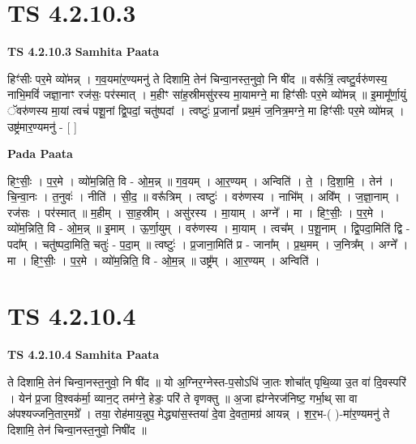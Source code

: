 \documentclass[17pt]{extarticle}
\begin{document}

\section{ TS 4.2.10.3 }

\textbf{TS 4.2.10.3 } \newline
\textbf{Samhita Paata} \newline

हिꣳ॑सीः पर॒मे व्यो॑मन्न् । ग॒व॒यमा॑र॒ण्यमनु॑ ते दिशामि॒ तेन॑ चिन्वा॒नस्त॒नुवो॒ नि षी॑द ॥ वरू᳚त्रिं॒ त्वष्टु॒र्वरु॑णस्य॒ नाभि॒मविं॑ जज्ञा॒नाꣳ रज॑सः॒ पर॑स्मात् । म॒हीꣳ सा॑ह॒स्रीमसु॑रस्य मा॒यामग्ने॒ मा हिꣳ॑सीः पर॒मे व्यो॑मन्न् ॥ इ॒मामू᳚र्णा॒युं ॅवरु॑णस्य मा॒यां त्वचं॑ पशू॒नां द्वि॒पदां॒ चतु॑ष्पदां । त्वष्टुः॑ प्र॒जानां᳚ प्रथ॒मं ज॒नित्र॒मग्ने॒ मा हिꣳ॑सीः पर॒मे व्यो॑मन्न् । उष्ट्र॑मार॒ण्यमनु॑ - [  ] \newline

\textbf{Pada Paata} \newline

हिꣳ॒॒सीः॒ । प॒र॒मे । व्यो॑म॒न्निति॒ वि - ओ॒म॒न्न् ॥ ग॒व॒यम् । आ॒र॒ण्यम् । अन्विति॑ । ते॒ । दि॒शा॒मि॒ । तेन॑ । चि॒न्वा॒नः । त॒नुवः॑ । नीति॑ । सी॒द॒ ॥ वरू᳚त्रिम् । त्वष्टुः॑ । वरु॑णस्य । नाभि᳚म् । अवि᳚म् । ज॒ज्ञा॒नाम् । रज॑सः । पर॑स्मात् ॥ म॒हीम् । सा॒ह॒स्रीम् । असु॑रस्य । मा॒याम् । अग्ने᳚ । मा । हिꣳ॒॒सीः॒ । प॒र॒मे । व्यो॑म॒न्निति॒ वि - ओ॒म॒न्न् ॥ इ॒माम् । ऊ॒र्णा॒युम् । वरु॑णस्य । मा॒याम् । त्वच᳚म् । प॒शू॒नाम् । द्वि॒पदा॒मिति॑ द्वि - पदा᳚म् । चतु॑ष्पदा॒मिति॒ चतुः॑ - प॒दा॒म् ॥ त्वष्टुः॑ । प्र॒जाना॒मिति॑ प्र - जाना᳚म् । प्र॒थ॒मम् । ज॒नित्र᳚म् । अग्ने᳚ । मा । हिꣳ॒॒सीः॒ । प॒र॒मे । व्यो॑म॒न्निति॒ वि - ओ॒म॒न्न् ॥ उष्ट्र᳚म् । आ॒र॒ण्यम् । अन्विति॑ ।  \newline





\section{ TS 4.2.10.4 }

\textbf{TS 4.2.10.4 } \newline
\textbf{Samhita Paata} \newline

ते दिशामि॒ तेन॑ चिन्वा॒नस्त॒नुवो॒ नि षी॑द ॥ यो अ॒ग्निर॒ग्नेस्त-प॒सोऽधि॑ जा॒तः शोचा᳚त् पृथि॒व्या उ॒त वा॑ दि॒वस्परि॑ । येन॑ प्र॒जा वि॒श्वक॑र्मा॒ व्यान॒ट् तम॑ग्ने॒ हेडः॒ परि॑ ते वृणक्तु ॥ अ॒जा ह्य॑ग्नेरज॑निष्ट॒ गर्भा॒थ् सा वा अ॑पश्यज्जनि॒तार॒मग्रे᳚ । तया॒ रोह॑माय॒न्नुप॒ मेद्ध्या॑स॒स्तया॑ दे॒वा दे॒वता॒मग्र॑ आयन्न् । श॒र॒भ-( )-मा॑र॒ण्यमनु॑ ते दिशामि॒ तेन॑ चिन्वा॒नस्त॒नुवो॒ निषी॑द ॥ \newline
\end{document}
